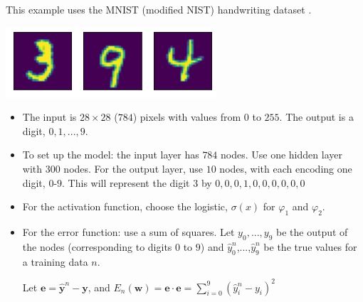 \documentclass[12pt,letterpaper,noanswers]{exam}
\newcommand{\vc}[1]{\boldsymbol{#1}}
\begin{document}
This example uses the MNIST (modified NIST) handwriting dataset \cite{lecun1998gradient}.

\includegraphics{img/C23mnist.png}

\begin{tcolorbox}
\begin{itemize}
\itemsep0pt
    \item The input is $28\times 28$ ($784$) pixels with values from $0$ to $255$.  The output is a digit, $0,1,...,9$.
\item To set up the model: the input layer has $784$ nodes.  Use one hidden layer with $300$ nodes.  For the output layer, use $10$ nodes, with each encoding one digit, $0$-$9$.  This will represent the digit $3$ by $0,0,0,1,0,0,0,0,0,0$
\item For the activation function, choose the logistic, $\sigma(x)$ for $\varphi_1$ and $\varphi_2$.
\item For the error function: use a sum of squares.  Let $y_0,...,y_9$ be the output of the nodes (corresponding to digits $0$ to $9$) and $\hat{y}_0^n$,...,$\hat{y}_9^n$ be the true values for a training data $n$. 

Let $\vc{e} = \vc{\hat{y}}^n-\vc{y}$, and $E_n(\vc{w}) = \vc{e}\cdot\vc{e} = \sum\limits_{i=0}^9 (\hat{y}_i^n-y_i)^2$
\end{itemize}
\end{tcolorbox}
\end{document}
